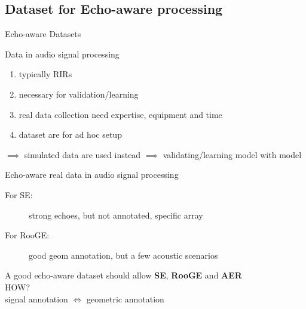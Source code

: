 \subsection{Dataset for Echo-aware processing}

\begin{frame}{Echo-aware Datasets}

    \begin{block}{\alert{Data} in audio signal processing}
        \begin{enumerate}
            \item typically RIRs
            \item necessary for validation/learning%
            \item real data collection need expertise, equipment and time
            \item dataset are for ad hoc setup
        \end{enumerate}

        \pause
        $\implies$ \alert{simulated data} are used instead $\implies$ \textcolor{myred}{validating/learning model with model}
    \end{block}

    \pause
    \begin{block}{\alert{Echo-aware real data} in audio signal processing}
        \vspace{-2mm}
        \begin{description}
            \item[For SE:] strong echoes\cmark, but not annotated\xmark, specific array\xmark
            \\{\small\cite{szoke2019building,bertin2019voicehome,remaggi2016acoustic}}
            \item[For RooGE:] good geom annotation\cmark, but a few acoustic scenarios\xmark
            \\{\small\cite{dokmanic2013acoustic,crocco2017uncalibrated,remaggi2019modeling}}
        \end{description}
    \end{block}

    \pause
    \begin{center}
        \textcolor{myred}{A good echo-aware dataset should allow \textbf{SE}, \textbf{RooGE} and \textbf{AER}
        \\HOW?
        \\signal annotation \quad $\Longleftrightarrow$ \quad geometric annotation}
    \end{center}

\end{frame}

